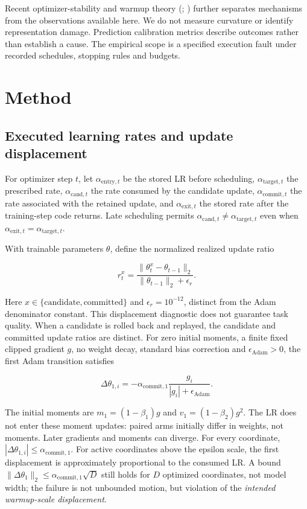\documentclass[referee,pdflatex,sn-mathphys-num]{sn-jnl}
\begin{document}
Recent optimizer-stability and warmup theory (\citep{bai2026spikes}; \citep{alimisis2026warmup}) further separates mechanisms from the observations available here. We do not measure curvature or identify representation damage. Prediction calibration metrics \citep{guo2017calibration} describe outcomes rather than establish a cause. The empirical scope is a specified execution fault under recorded schedules, stopping rules and budgets.

\section{Method}\label{method}

\subsection{Executed learning rates and update displacement}\label{executed-learning-rates-and-update-displacement}

For optimizer step \(t\), let \(\alpha_{\mathrm{entry},t}\) be the stored LR before scheduling, \(\alpha_{\mathrm{target},t}\) the prescribed rate, \(\alpha_{\mathrm{cand},t}\) the rate consumed by the candidate update, \(\alpha_{\mathrm{commit},t}\) the rate associated with the retained update, and \(\alpha_{\mathrm{exit},t}\) the stored rate after the training-step code returns. Late scheduling permits \(\alpha_{\mathrm{cand},t}\ne\alpha_{\mathrm{target},t}\) even when \(\alpha_{\mathrm{exit},t}=\alpha_{\mathrm{target},t}\).

With trainable parameters \(\theta\), define the normalized realized update ratio

\[
 r_t^{x}=\frac{\|\theta_t^{x}-\theta_{t-1}\|_2}{\|\theta_{t-1}\|_2+\epsilon_r}. \tag{1}
\]

Here \(x\in\{\mathrm{candidate},\mathrm{committed}\}\) and \(\epsilon_r=10^{-12}\), distinct from the Adam denominator constant. This displacement diagnostic does not guarantee task quality. When a candidate is rolled back and replayed, the candidate and committed update ratios are distinct. For zero initial moments, a finite fixed clipped gradient \(g\), no weight decay, standard bias correction and \(\epsilon_{\mathrm{Adam}}>0\), the first Adam transition satisfies

\[
\Delta\theta_{1,i}=-\alpha_{\mathrm{commit},1}\frac{g_i}{|g_i|+\epsilon_{\mathrm{Adam}}}. \tag{2}
\]

The initial moments are \(m_1=(1-\beta_1)g\) and \(v_1=(1-\beta_2)g^2\). The LR does not enter these moment updates: paired arms initially differ in weights, not moments. Later gradients and moments can diverge. For every coordinate, \(|\Delta\theta_{1,i}|\leq\alpha_{\mathrm{commit},1}\). For active coordinates above the epsilon scale, the first displacement is approximately proportional to the consumed LR. A bound \(\|\Delta\theta_1\|_2\le\alpha_{\mathrm{commit},1}\sqrt{D}\) still holds for \(D\) optimized coordinates, not model width; the failure is not unbounded motion, but violation of the \emph{intended warmup-scale displacement}.
\end{document}

